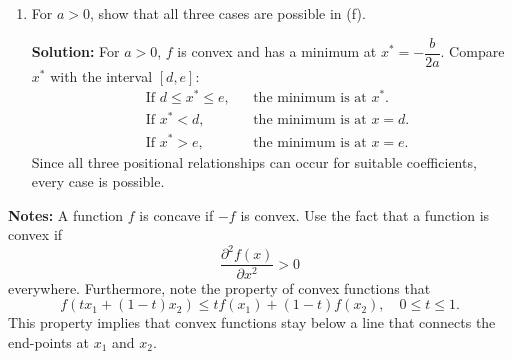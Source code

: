 \documentclass[11pt]{article}
\begin{document}
\begin{enumerate}[label=1(\alph*)]
	\item For $a > 0$, show that all three cases are possible in (f).
	
	\textbf{Solution:}  
	For $a>0$, $f$ is convex and has a minimum at $x^*=-\dfrac{b}{2a}$.  
	Compare $x^*$ with the interval $[d,e]$:
	\[
	\begin{aligned}
		&\text{If } d \le x^* \le e, && \text{the minimum is at } x^*.\\
		&\text{If } x^* < d,        && \text{the minimum is at } x=d.\\
		&\text{If } x^* > e,        && \text{the minimum is at } x=e.
	\end{aligned}
	\]
	Since all three positional relationships can occur for suitable coefficients, every case is possible.
	
	\end{enumerate}
	
	\noindent\textbf{Notes:} A function $f$ is concave if $-f$ is convex. Use the fact that a function is convex if
	\[
	\frac{\partial^{2} f(x)}{\partial x^{2}} > 0
	\]
	everywhere. Furthermore, note the property of convex functions that
	\[
	f(t x_{1} + (1 - t) x_{2}) \le t f(x_{1}) + (1 - t) f(x_{2}), \quad 0 \le t \le 1.
	\]
	This property implies that convex functions stay below a line that connects the end-points at $x_{1}$ and $x_{2}$.
\end{document}

